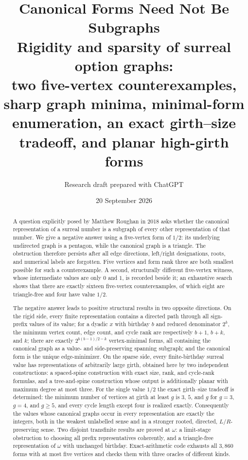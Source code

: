 \documentclass[11pt,a4paper]{article}
\title{\color{inkblue}\LARGE\bfseries Canonical Forms Need Not Be Subgraphs\\[5pt]
\large Rigidity and sparsity of surreal option graphs:\\
two five-vertex counterexamples, sharp graph minima, minimal-form\\
enumeration, an exact girth--size tradeoff, and planar high-girth forms}
\author{Research draft prepared with ChatGPT}
\date{20 September 2026}
\numberwithin{equation}{section}
\theoremstyle{definition}
\theoremstyle{remark}
\begin{document}
\maketitle
\thispagestyle{empty}
\begin{abstract}
A question explicitly posed by Matthew Roughan in 2018 asks whether the
canonical representation of a surreal number is a subgraph of every other
representation of that number. We give a negative answer using a five-vertex
form of $1/2$: its underlying undirected graph is a pentagon, while the canonical
graph is a triangle. The obstruction therefore persists after all edge
directions, left/right designations, roots, and numerical labels are forgotten.
Five vertices and form rank three are both smallest possible for such a
counterexample. A second, structurally different five-vertex witness, whose
intermediate values are only $0$ and $1$, is recorded beside it; an exhaustive
search shows that there are exactly sixteen five-vertex counterexamples, of
which eight are triangle-free and four have value $1/2$.

The negative answer leads to positive structural results in two opposite
directions. On the rigid side, every finite representation contains a directed
path through all sign-prefix values of its value; for a dyadic $x$ with birthday
$b$ and reduced denominator $2^k$, the minimum vertex count, edge count, and
cycle rank are respectively $b+1$, $b+k$, and $k$; there are exactly
$2^{b(b-1)/2-k}$ vertex-minimal forms, all containing the canonical graph as a
value- and side-preserving spanning subgraph; and the canonical form is the
unique edge-minimizer. On the sparse side, every finite-birthday surreal value
has representations of arbitrarily large girth, obtained here by two independent
constructions: a spaced-spine construction with exact size, rank, and cycle-rank
formulas, and a tree-and-spine construction whose output is additionally planar
with maximum degree at most three. For the single value $1/2$ the exact
girth--size tradeoff is determined: the minimum number of vertices at girth at
least $g$ is $3$, $5$, and $g$ for $g=3$, $g=4$, and $g\geq5$, and every cycle
length except four is realized exactly. Consequently the values whose canonical
graphs occur in every representation are exactly the integers, both in the
weakest unlabelled sense and in a stronger rooted, directed, $L/R$-preserving
sense. Two disjoint transfinite results are proved at $\omega$: a limit-stage
obstruction to choosing all prefix representatives coherently, and a
triangle-free representation of $\omega$ with unchanged birthday. Exact-arithmetic
code exhausts all $3{,}860$ forms with at most five vertices and checks them with
three oracles of different kinds.
\end{abstract}
\end{document}
